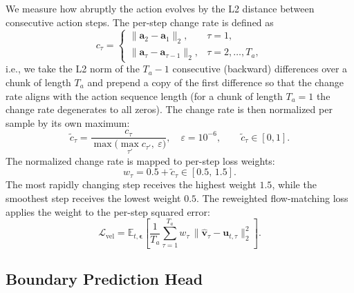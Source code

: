 We measure how abruptly the action evolves by the L2 distance between consecutive action
steps. The per-step change rate is defined as
%
\begin{equation}
  c_\tau =
  \begin{cases}
    \|\mathbf{a}_2 - \mathbf{a}_1\|_2, & \tau = 1,\\[2pt]
    \|\mathbf{a}_\tau - \mathbf{a}_{\tau-1}\|_2, & \tau = 2, \ldots, T_a,
  \end{cases}
  \label{eq:change_rate}
\end{equation}
%
i.e., we take the L2 norm of the $T_a - 1$ consecutive (backward) differences over a chunk
of length $T_a$ and prepend a copy of the first difference so that the change rate aligns
with the action sequence length (for a chunk of length $T_a = 1$ the change rate
degenerates to all zeros). The change rate is then normalized per sample by its own
maximum:
%
\begin{equation}
  \tilde{c}_\tau
  = \frac{c_\tau}{\max\!\bigl(\max_{\tau'} c_{\tau'},\ \varepsilon\bigr)},
  \quad \varepsilon = 10^{-6},
  \qquad \tilde{c}_\tau \in [0, 1].
  \label{eq:norm_rate}
\end{equation}
%
The normalized change rate is mapped to per-step loss weights:
%
\begin{equation}
  w_\tau = 0.5 + \tilde{c}_\tau \in [0.5,\, 1.5].
  \label{eq:step_weight}
\end{equation}
%
The most rapidly changing step receives the highest weight $1.5$, while the smoothest step
receives the lowest weight $0.5$. The reweighted flow-matching loss applies the weight to
the per-step squared error:
%
\begin{equation}
  \mathcal{L}_{\text{vel}}
  = \mathbb{E}_{t,\boldsymbol{\epsilon}}
    \left[
      \frac{1}{T_a} \sum_{\tau=1}^{T_a}
      w_\tau \,
      \bigl\|\hat{\mathbf{v}}_\tau - \mathbf{u}_{t,\tau}\bigr\|_2^2
    \right].
  \label{eq:weighted_loss}
\end{equation}

\subsection{Boundary Prediction Head}

